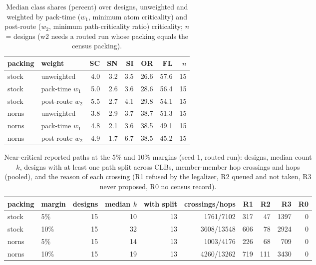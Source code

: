 \begin{table}[t]
\caption{Median class shares (percent) over designs, unweighted and weighted by pack-time ($w_1$, minimum atom criticality) and post-route ($w_2$, minimum path-criticality ratio) criticality; $n$ = designs (w2 needs a routed run whose packing equals the census packing).}
\label{tab:r4weighted}
\centering\scriptsize\setlength{\tabcolsep}{3pt}
\begin{tabular}{@{}llrrrrrr@{}}
\toprule
packing & weight & SC & SN & SI & OR & FL & $n$ \\
\midrule
stock & unweighted & 4.0 & 3.2 & 3.5 & 26.6 & 57.6 & 15 \\
stock & pack-time $w_1$ & 5.0 & 2.6 & 3.6 & 28.6 & 56.4 & 15 \\
stock & post-route $w_2$ & 5.5 & 2.7 & 4.1 & 29.8 & 54.1 & 15 \\
norns & unweighted & 3.8 & 2.9 & 3.7 & 38.7 & 51.3 & 15 \\
norns & pack-time $w_1$ & 4.8 & 2.1 & 3.6 & 38.5 & 49.1 & 15 \\
norns & post-route $w_2$ & 4.9 & 1.7 & 6.7 & 38.5 & 45.2 & 15 \\
\bottomrule
\end{tabular}
\end{table}

\begin{table}[t]
\caption{Near-critical reported paths at the 5\% and 10\% margins (seed 1, routed run): designs, median count $k$, designs with at least one path split across CLBs, member-member hop crossings and hops (pooled), and the reason of each crossing (R1 refused by the legalizer, R2 queued and not taken, R3 never proposed, R0 no census record).}
\label{tab:r4reasons}
\centering\scriptsize\setlength{\tabcolsep}{2pt}
\begin{tabular}{@{}llrrrrrrrr@{}}
\toprule
packing & margin & designs & median $k$ & with split & crossings/hops & R1 & R2 & R3 & R0 \\
\midrule
stock & 5\% & 15 & 10 & 13 & 1761/7102 & 317 & 47 & 1397 & 0 \\
stock & 10\% & 15 & 32 & 13 & 3608/13548 & 606 & 78 & 2924 & 0 \\
norns & 5\% & 15 & 14 & 13 & 1003/4176 & 226 & 68 & 709 & 0 \\
norns & 10\% & 15 & 19 & 13 & 4260/13262 & 719 & 111 & 3430 & 0 \\
\bottomrule
\end{tabular}
\end{table}

